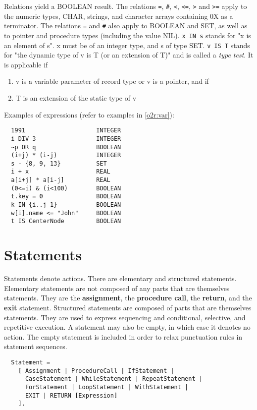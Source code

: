 \noindent
Relations yield a BOOLEAN result. The relations \verb|=|,
\verb|#|, \verb|<|, \verb|<=|, \verb|>| and \verb|>=|
apply to the numeric types, CHAR, strings, and character arrays containing
0X as a terminator.
The relations \verb|=| and \verb|#|
also apply to BOOLEAN and SET, as well
as to pointer and procedure types (including the value NIL).
\verb|x IN s| stands for "x is an element of s". x must be of an integer
type, and s of type SET.
\verb|v IS T| stands for "the dynamic type of v is T (or an extension of
T)" and is called a {\em type test}. It is applicable if
\begin{enumerate}
\item
     v is a variable parameter of record type or v is
     a pointer, and if
\item
     T is an extension of the static type of v
\end{enumerate}

\noindent
Examples of expressions (refer to examples in \ref{o2r:var}):
\begin{verbatim}
  1991                    INTEGER
  i DIV 3                 INTEGER
  ~p OR q                 BOOLEAN
  (i+j) * (i-j)           INTEGER
  s - {8, 9, 13}          SET
  i + x                   REAL
  a[i+j] * a[i-j]         REAL
  (0<=i) & (i<100)        BOOLEAN
  t.key = 0               BOOLEAN
  k IN {i..j-1}           BOOLEAN
  w[i].name <= "John"     BOOLEAN
  t IS CenterNode         BOOLEAN
\end{verbatim}

\section{Statements}

Statements denote actions. There are elementary and structured statements.
Elementary statements are not composed of any parts that are themselves
statements. They are the {\bf assignment}, the {\bf procedure call},
the {\bf return}, and the {\bf exit} statement. Structured statements
are composed of parts that are themselves statements. They are used
to express sequencing and conditional, selective, and repetitive execution.
A statement may also be empty, in which case it denotes no action.
The empty statement is included in order to relax punctuation rules
in statement sequences.
{\BNFsize
\begin{verbatim}
  Statement =
    [ Assignment | ProcedureCall | IfStatement |
      CaseStatement | WhileStatement | RepeatStatement |
      ForStatement | LoopStatement | WithStatement |
      EXIT | RETURN [Expression]
    ].
\end{verbatim}}

